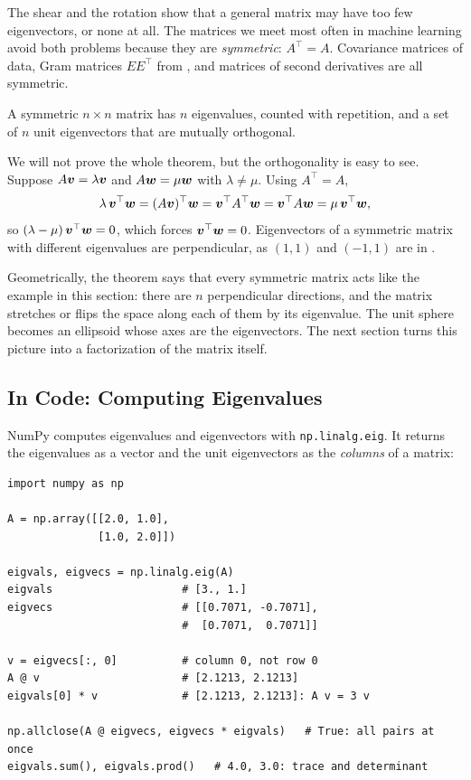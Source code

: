 The shear and the rotation show that a general matrix may have too few
eigenvectors, or none at all. The matrices we meet most often in
machine learning avoid both problems because they are \emph{symmetric}:
$A^\top = A$. Covariance matrices of data, Gram matrices $EE^\top$ from
, and matrices of second derivatives are all
symmetric.

\begin{theorem}
  \label{thm:spectral}
  A symmetric $n \times n$ matrix has $n$ eigenvalues, counted with
  repetition, and a set of $n$ unit eigenvectors that are mutually
  orthogonal.
\end{theorem}

We will not prove the whole theorem, but the orthogonality is easy to see.
Suppose $A\bm{v} = \lambda\bm{v}$ and $A\bm{w} = \mu\bm{w}$ with
$\lambda \ne \mu$. Using $A^\top = A$,
\[
  \lambda\, \bm{v}^\top \bm{w}
  = (A\bm{v})^\top \bm{w}
  = \bm{v}^\top A^\top \bm{w}
  = \bm{v}^\top A \bm{w}
  = \mu\, \bm{v}^\top \bm{w} ,
\]
so $(\lambda - \mu)\, \bm{v}^\top \bm{w} = 0$, which forces
$\bm{v}^\top \bm{w} = 0$. Eigenvectors of a symmetric matrix with
different eigenvalues are perpendicular, as $(1, 1)$ and $(-1, 1)$ are in
.

Geometrically, the theorem says that every symmetric matrix acts like the
example in this section: there are $n$ perpendicular directions, and the
matrix stretches or flips the space along each of them by its eigenvalue.
The unit sphere becomes an ellipsoid whose axes are the eigenvectors. The
next section turns this picture into a factorization of the matrix
itself.

\subsection{In Code: Computing Eigenvalues}
\label{sec:ch04-eigen-code}

NumPy computes eigenvalues and eigenvectors with \texttt{np.linalg.eig}.
It returns the eigenvalues as a vector and the unit eigenvectors as the
\emph{columns} of a matrix:

\begin{lstlisting}
import numpy as np

A = np.array([[2.0, 1.0],
              [1.0, 2.0]])

eigvals, eigvecs = np.linalg.eig(A)
eigvals                    # [3., 1.]
eigvecs                    # [[0.7071, -0.7071],
                           #  [0.7071,  0.7071]]

v = eigvecs[:, 0]          # column 0, not row 0
A @ v                      # [2.1213, 2.1213]
eigvals[0] * v             # [2.1213, 2.1213]: A v = 3 v

np.allclose(A @ eigvecs, eigvecs * eigvals)   # True: all pairs at once
eigvals.sum(), eigvals.prod()   # 4.0, 3.0: trace and determinant
\end{lstlisting}

